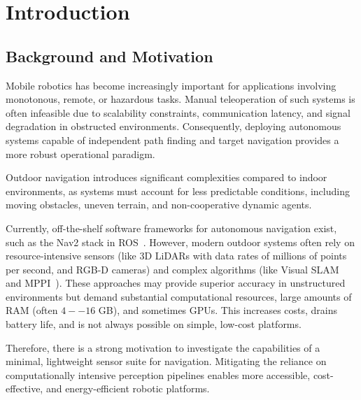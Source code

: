 
\chapter{Introduction}
\label{chap:introduction}

\section{Background and Motivation}
\label{sec:background-motivation}

Mobile robotics has become increasingly important for applications involving monotonous, remote, or hazardous tasks. Manual teleoperation of such systems is often infeasible due to scalability constraints, communication latency, and signal degradation in obstructed environments. Consequently, deploying autonomous systems capable of independent path finding and target navigation provides a more robust operational paradigm.

Outdoor navigation introduces significant complexities compared to indoor environments, as systems must account for less predictable conditions, including moving obstacles, uneven terrain, and non-cooperative dynamic agents.

Currently, off-the-shelf software frameworks for autonomous navigation exist, such as the Nav2 stack in ROS~\cite{nav2_docs}. However, modern outdoor systems often rely on resource-intensive sensors (like 3D LiDARs with data rates of millions of points per second, and RGB-D cameras) and complex algorithms (like Visual SLAM~\cite{schmidt2025vislam} and MPPI~\cite{williams2016mppi}).
These approaches may provide superior accuracy in unstructured environments but demand substantial computational resources, large amounts of RAM (often $4 -- 16$ GB), and sometimes GPUs. This increases costs, drains battery life, and is not always possible on simple, low-cost platforms.

Therefore, there is a strong motivation to investigate the capabilities of a minimal, lightweight sensor suite for navigation. Mitigating the reliance on computationally intensive perception pipelines enables more accessible, cost-effective, and energy-efficient robotic platforms.

